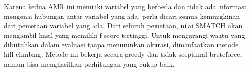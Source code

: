 Karena kedua \gls{AMR} ini memiliki variabel yang berbeda dan tidak ada informasi mengenai hubungan antar variabel yang ada, perlu dicari semua kemungkinan dari pemetaan variabel yang ada.
Dari seluruh pemetaan, nilai \gls{SMATCH} akan mengambil hasil yang memiliki f-score tertinggi.
Untuk mengurangi waktu yang dibutuhkan dalam evaluasi tanpa menurunkan akurasi, dimanfaatkan metode hill-climbing.
Metode ini bekerja secara greedy dan tidak seoptimal bruteforce, namun bisa menghasilkan perhitungan yang cukup baik.

